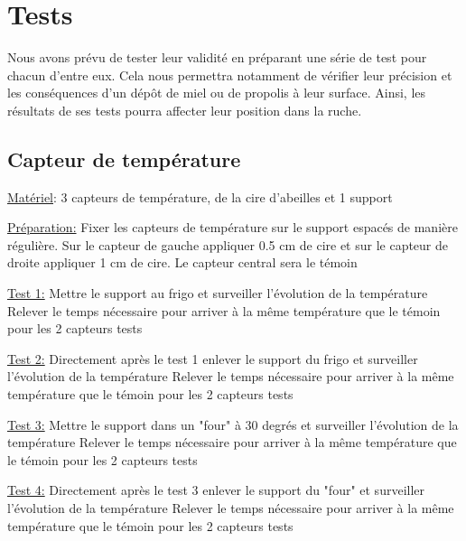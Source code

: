\chapter{Tests}

Nous avons prévu de tester leur validité en préparant une série de test pour chacun d'entre eux. Cela nous permettra notamment de vérifier leur précision et les conséquences d'un dépôt de miel ou de propolis à leur surface. Ainsi, les résultats de ses tests pourra affecter leur position dans la ruche. 

\section{Capteur de température}

\noindent \underline{Matériel}:   
3 capteurs de température, de la cire d'abeilles et 1 support\newline  

\noindent \underline{Préparation:} \newline 
Fixer les capteurs de température sur le support espacés de manière régulière. Sur le capteur de gauche appliquer 0.5 cm de cire et sur le capteur de droite appliquer 1 cm de cire. Le capteur central sera le témoin \newline

\noindent \underline{Test 1:} \newline 
Mettre le support au frigo et surveiller l'évolution de la température\newline   
Relever le temps nécessaire pour arriver à la même température que le témoin pour les 2 capteurs tests  

\noindent \underline{Test 2:}  \newline 
Directement après le test 1 enlever le support du frigo et surveiller l'évolution de la température\newline   
Relever le temps nécessaire pour arriver à la même température que le témoin pour les 2 capteurs tests

\noindent \underline{Test 3:}  \newline 
Mettre le support dans un "four" à 30 degrés et surveiller l'évolution de la température\newline   
Relever le temps nécessaire pour arriver à la même température que le témoin pour les 2 capteurs tests  
  
\noindent \underline{Test 4:}  \newline 
Directement après le test 3 enlever le support du "four" et surveiller l'évolution de la température\newline   
Relever le temps nécessaire pour arriver à la même température que le témoin pour les 2 capteurs tests

